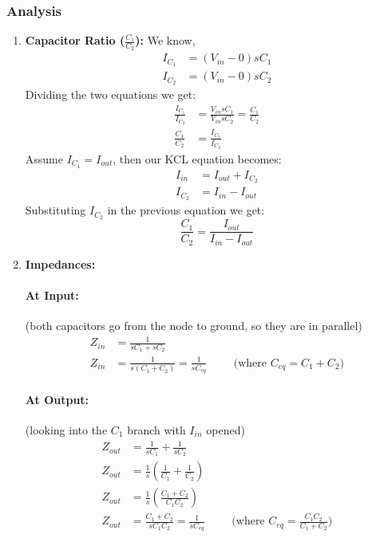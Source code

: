 \subsubsection{Analysis}
\begin{enumerate}
  \item \textbf{Capacitor Ratio (\(\frac{C_1}{C_2}\)):}
    We know,
    \begin{align*}
      I_{C_1} &= (V_{in} - 0)sC_1 \\
      I_{C_2} &= (V_{in} - 0)sC_2
    \end{align*}
    Dividing the two equations we get:
    \begin{align*}
      \frac{I_{C_1}}{I_{C_2}} &= \frac{V_{in}sC_1}{V_{in}sC_2} = \frac{C_1}{C_2} \\
      \frac{C_1}{C_2} &= \frac{I_{C_1}}{I_{C_2}}
    \end{align*}
    Assume \(I_{C_1} = I_{out}\), then our KCL
    equation becomes:
    \begin{align*}
      I_{in} &= I_{out} + I_{C_2} \\
      I_{C_2} &= I_{in} - I_{out}
    \end{align*}
    Substituting \(I_{C_2}\) in the previous equation
    we get:
    \[
      \frac{C_1}{C_2} = \frac{I_{out}}{I_{in} - I_{out}}
    \]
  \item \textbf{Impedances:}
    \paragraph{At Input:} (both capacitors go from the node to ground, so
    they are in parallel)
      \begin{align*}
        Z_{in} &= \frac{1}{sC_1 + sC_2} \\
        Z_{in} &= \frac{1}{s(C_1 + C_2)} = \frac{1}{sC_{eq}} \hspace{1cm} \text{(where \(C_{eq} = C_1 + C_2\))}
      \end{align*}
    \paragraph{At Output:} (looking into the \(C_1\) branch with \(I_{in}\) opened)
      \begin{align*}
        Z_{out} &= \frac{1}{sC_1} + \frac{1}{sC_2} \\
        Z_{out} &= \frac{1}{s}\left(\frac{1}{C_1} + \frac{1}{C_2}\right) \\
        Z_{out} &= \frac{1}{s}\left(\frac{C_1 + C_2}{C_1 C_2}\right) \\
        Z_{out} &= \frac{C_1 + C_2}{s C_1 C_2} = \frac{1}{sC_{eq}} \hspace{1cm} \text{(where \(C_{eq} = \frac{C_1 C_2}{C_1 + C_2}\))}
      \end{align*}
\end{enumerate}

